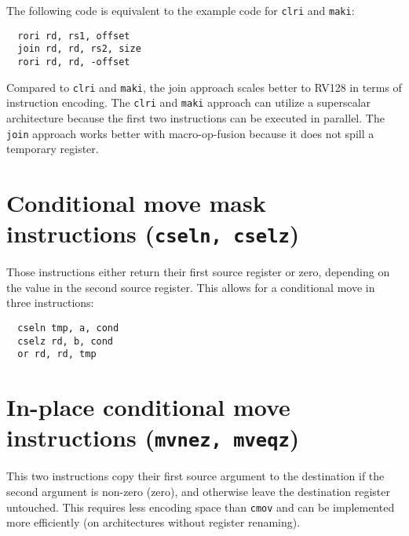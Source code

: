 The following code is equivalent to the example code for {\tt clri} and {\tt maki}:

\begin{verbatim}
  rori rd, rs1, offset
  join rd, rd, rs2, size
  rori rd, rd, -offset
\end{verbatim}



Compared to {\tt clri} and {\tt maki}, the join approach scales better to RV128
in terms of instruction encoding. The {\tt clri} and {\tt maki} approach can
utilize a superscalar architecture because the first two instructions can be
executed in parallel. The {\tt join} approach works better with
macro-op-fusion because it does not spill a temporary register.


\section{Conditional move mask instructions (\texttt{cseln, cselz})}

Those instructions either return their first source register or zero, depending on the
value in the second source register. This allows for a conditional move in three instructions:

\begin{verbatim}
  cseln tmp, a, cond
  cselz rd, b, cond
  or rd, rd, tmp
\end{verbatim}




\section{In-place conditional move instructions (\texttt{mvnez, mveqz})}

This two instructions copy their first source argument to the destination if the second
argument is non-zero (zero), and otherwise leave the destination register untouched.
This requires less encoding space than \texttt{cmov} and can be implemented more
efficiently (on architectures without register renaming).


